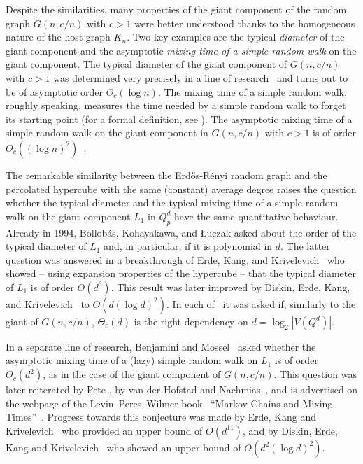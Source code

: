 \documentclass[reqno,final,a4paper]{amsart}
\theoremstyle{definition}
\newcommand{\1}{\mathbbm{1}}
\begin{document}
Despite the similarities, many properties of the giant component of the random graph $G(n,c/n)$ with $c>1$ were better understood thanks to the homogeneous nature of the host graph $K_n$.
Two key examples are the typical \textit{diameter} of the giant component and the asymptotic \textit{mixing time of a simple random walk} on the giant component.
The typical diameter of the giant component of $G(n,c/n)$ with $c>1$ was determined very precisely in a line of research~\cite{CL01,FR07,RW10} and turns out to be of asymptotic order $\Theta_c(\log n)$.
The mixing time of a simple random walk, roughly speaking, measures the time needed by a simple random walk to forget its starting point (for a formal definition, see ).
The asymptotic mixing time of a simple random walk on the giant component in $G(n,c/n)$ with $c>1$ is of order $\Theta_c((\log n)^2)$~\cite{BKW14,FR08}.

The remarkable similarity between the Erd\H{o}s-R\'enyi random graph and the percolated hypercube with the same (constant) average degree raises the question whether the typical diameter and the typical mixing time of a simple random walk on the giant component $L_1$ in $Q^d_p$ have the same quantitative behaviour.
Already in 1994, Bollob\'as, Kohayakawa, and \L{}uczak \cite[Problem 15]{BKL94d} asked about the order of the typical diameter of $L_1$ and, in particular, if it is polynomial in $d$. 
The latter question was answered in a breakthrough of Erde, Kang, and Krivelevich~\cite{EKK22} who showed -- using expansion properties of the hypercube -- that the typical diameter of $L_1$ is of order $O(d^3)$.
This result was later improved by Diskin, Erde, Kang, and Krivelevich~\cite{DEKK24} to $O(d (\log d)^2)$. 
In each of~\cite{DEKK24,EKK22} it was asked if, similarly to the giant of $G(n,c/n)$, $\Theta_c(d)$ is the right dependency on $d=\log_2|V(Q^d)|$.

In a separate line of research, Benjamini and Mossel~\cite[Section 3]{BM03} asked whether the asymptotic mixing time of a (lazy) simple random walk on $L_1$ is of order $\Theta_c(d^2)$, as in the case of the giant component of $G(n,c/n)$. 
This question was later reiterated by Pete \cite{Pete08}, by van der Hofstad and Nachmias~\cite[Open Problem (6)]{HN17}, and is advertised on the webpage of the Levin--Peres--Wilmer book~\cite{LPW17} ``Markov Chains and Mixing Times''~\cite[Question 3]{Pereswebsite}.
Progress towards this conjecture was made by Erde, Kang and Krivelevich~\cite{EKK22} who provided an upper bound of $O(d^{11})$, and by Diskin, Erde, Kang and Krivelevich~\cite{DEKK24} who showed an upper bound of $O(d^2(\log d)^2)$.
\end{document}
